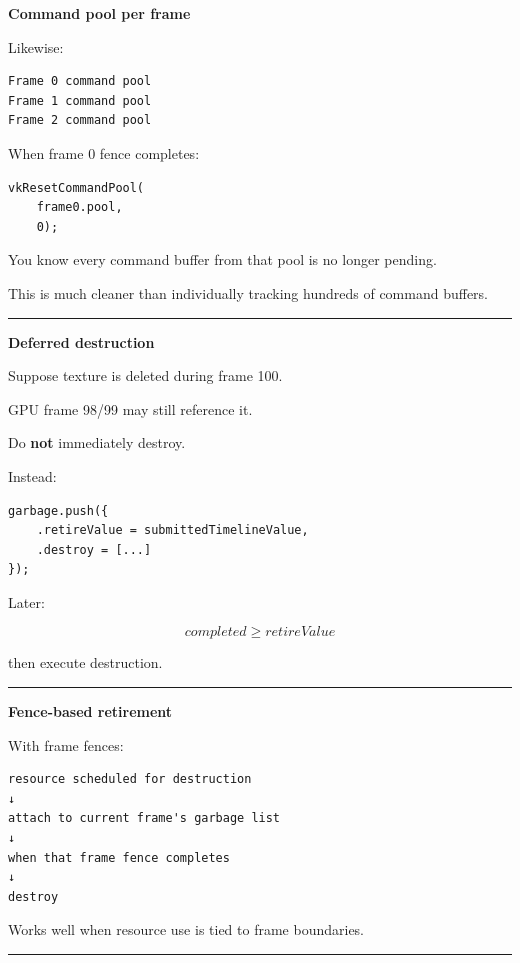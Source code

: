 \textbf{Command pool per frame}

Likewise:

\begin{verbatim}
Frame 0 command pool
Frame 1 command pool
Frame 2 command pool
\end{verbatim}

When frame 0 fence completes:

\begin{verbatim}
vkResetCommandPool(
    frame0.pool,
    0);
\end{verbatim}

You know every command buffer from that pool is no longer pending.

This is much cleaner than individually tracking hundreds of command buffers.

\begin{center}\rule{0.5\linewidth}{0.5pt}\end{center}

\textbf{Deferred destruction}

Suppose texture is deleted during frame 100.

GPU frame 98/99 may still reference it.

Do \textbf{not} immediately destroy.

Instead:

\begin{verbatim}
garbage.push({
    .retireValue = submittedTimelineValue,
    .destroy = [...]
});
\end{verbatim}

Later:

\[
completed\ge retireValue
\]

then execute destruction.

\begin{center}\rule{0.5\linewidth}{0.5pt}\end{center}

\textbf{Fence-based retirement}

With frame fences:

\begin{verbatim}
resource scheduled for destruction
↓
attach to current frame's garbage list
↓
when that frame fence completes
↓
destroy
\end{verbatim}

Works well when resource use is tied to frame boundaries.

\begin{center}\rule{0.5\linewidth}{0.5pt}\end{center}

